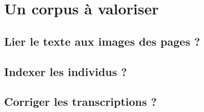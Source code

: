 \part{Un corpus à valoriser}

\clearpage
\thispagestyle{empty}
\cleardoublepage

\chapter{Lier le texte aux images des pages ?}

\chapter{Indexer les individus ?}

\chapter{Corriger les transcriptions ?}